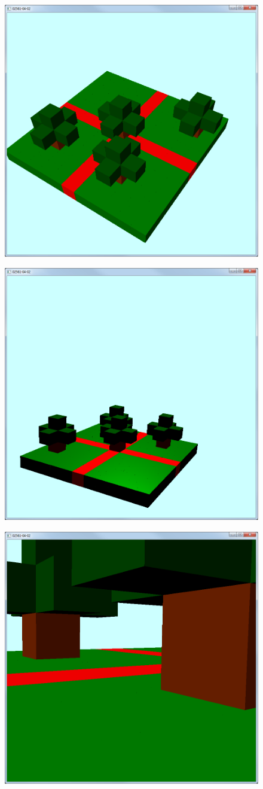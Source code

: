 \documentclass[11pt]{article}
\begin{document}
\begin{figure}[H]
	\centering
	\includegraphics[width=0.5\linewidth]{images/project_1}
	\label{fig:project_1}
\end{figure}
\begin{figure}[H]
	\centering
	\includegraphics[width=0.5\linewidth]{images/project_2}
	\label{fig:project_2}
\end{figure}
\begin{figure}[H]
	\centering
	\includegraphics[width=0.5\linewidth]{images/project_3}
	\label{fig:project_3}
\end{figure}
\end{document}
